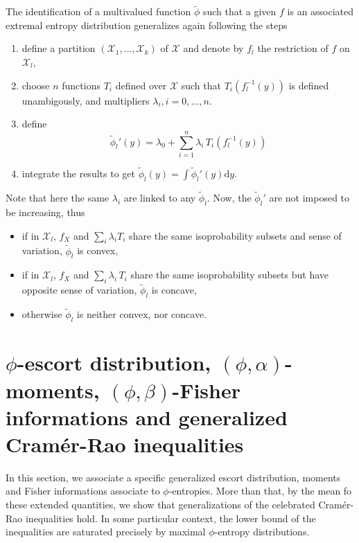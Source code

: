 \documentclass[english,sort&compress]{elsarticle}
\theoremstyle{definition}
\theoremstyle{plain}
\theoremstyle{plain}
\def\d{\mathrm{d}}
\def\X{\mathcal{X}}
\begin{document}
The  identification of  a multivalued  function $\widetilde{\phi}$  such  that a
given  $f$ is  an  associated extremal  entropy  distribution generalizes  again
following the steps
%
\begin{enumerate}
\item define  a partition $(\X_1,\ldots,\X_k)$ of  $\X$ and denote  by $f_l$ the
  restriction of $f$ on $\X_l$,
\item choose $n$ functions $T_i$  defined over $\X$ such that $T_i(f_l^{-1}(y))$
  is defined unambigously, and multipliers $\lambda_i, i=0,\ldots,n$.
\item define
  \begin{equation}\label{eq:derivative-phil-notconcave}
  \widetilde{\phi}_l'(y) = \lambda_0 + \sum_{i=1}^n \lambda_i \,
  T_i\!\left(f_l^{-1}(y)\right)
  \end{equation}
\item integrate the results  to get ${\displaystyle \widetilde{\phi}_l(y) = \int
    \widetilde{\phi}_l'(y)\d y}$.
\end{enumerate}
%
Note  that here  the same  $\lambda_i$ are  linked to  any $\widetilde{\phi}_l$.
Now, the $\widetilde{\phi}_l'$ are not imposed to be increasing, thus
%
\begin{itemize}
\item  if  in   $\X_l$,  $f_X$  and  $\sum_i  \lambda_i   T_i$  share  the  same
  isoprobability subsets and sense of variation, $\widetilde{\phi}_l$ is convex,
\item  if  in  $\X_l$, $f_X$  and  $\sum_i  \lambda_i  \,  T_i$ share  the  same
  isoprobability    subsets   but    have   opposite    sense    of   variation,
  $\widetilde{\phi}_l$ is concave,
\item otherwise $\widetilde{\phi}_l$ is neither convex, nor concave. 
\end{itemize}



\section{$\phi$-escort           distribution,          $(\phi,\alpha)$-moments,
  $(\phi,\beta)$-Fisher informations and generalized Cram\'er-Rao inequalities}
\label{sec:EscortCR}

In  this  section, we  associate  a  specific  generalized escort  distribution,
moments and Fisher informations  associate to $\phi$-entropies.  More than that,
by the  mean fo these extended  quantities, we show that  generalizations of the
celebrated Cram\'er-Rao inequalities hold. In some particular context, the lower
bound  of the  inequalities are  saturated precisely  by  maximal $\phi$-entropy
distributions.
\end{document}
